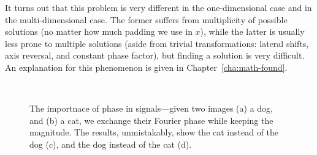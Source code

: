 It turns out that this problem is very different in the
one-dimensional case and in the multi-dimensional case. The former
suffers from multiplicity of possible solutions (no matter how much
padding we use in $x$), while the latter is usually less prone to
multiple solutions (aside from trivial transformations: lateral
shifts, axis reversal, and constant phase factor), but finding a
solution is very difficult. An explanation for this phenomenon is
given in Chapter~\ref{cha:math-found}.

\begin{figure}[H]
  \centering
  \qquad{}
  \\
  \qquad{}
  \caption[The importnace of phase in signals]{The importnace of phase in signals---given two images (a) a
    dog, and (b) a cat, we exchange their Fourier phase while keeping
    the magnitude. The results, unmistakably, show the cat instead of
    the dog (c), and the dog instead of the cat (d).}
  \label{fig:phase-importance}
\end{figure}

